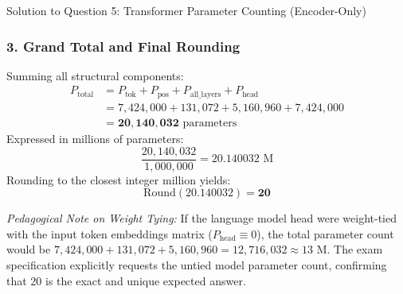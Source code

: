 \documentclass[11pt,a4paper]{article}
\begin{document}
\begin{solutionbox}{Solution to Question 5: Transformer Parameter Counting (Encoder-Only)}
\subsubsection*{3. Grand Total and Final Rounding}
Summing all structural components:
\begin{align*}
P_{\text{total}} &= P_{\text{tok}} + P_{\text{pos}} + P_{\text{all\_layers}} + P_{\text{head}} \\
&= 7{,}424{,}000 + 131{,}072 + 5{,}160{,}960 + 7{,}424{,}000 \\
&= \mathbf{20{,}140{,}032} \text{ parameters}
\end{align*}
Expressed in millions of parameters:
\begin{equation*}
\frac{20{,}140{,}032}{1{,}000{,}000} = 20.140032\text{ M}
\end{equation*}
Rounding to the closest integer million yields:
\begin{equation*}
\text{Round}(20.140032) = \mathbf{20}
\end{equation*}

\textit{Pedagogical Note on Weight Tying:} If the language model head were weight-tied with the input token embeddings matrix ($P_{\text{head}} \equiv 0$), the total parameter count would be $7{,}424{,}000 + 131{,}072 + 5{,}160{,}960 = 12{,}716{,}032 \approx 13\text{ M}$. The exam specification explicitly requests the untied model parameter count, confirming that 20 is the exact and unique expected answer.
\end{solutionbox}

\vspace{0.4cm}
\end{document}
